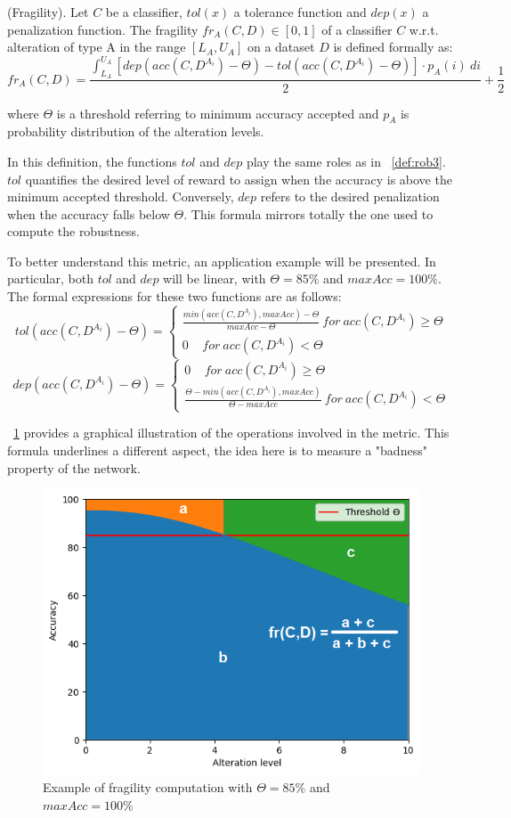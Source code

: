 \begin{definition} (Fragility).
	Let $C$ be a classifier, $tol(x)$ a tolerance function and $dep(x)$ a penalization function.
	The fragility $fr_A(C,D) \in [0,1]$ of a classifier $C$ w.r.t. alteration of type A in the range $[L_A, U_A]$ on a dataset $D$ is defined formally as:
	\[
		fr_A(C,D) = \frac{\int_{L_A}^{U_A} [dep(acc(C,D^{A_i}) - \Theta) - tol(acc(C,D^{A_i}) - \Theta)] \cdot p_A(i)\ di}{2} + \frac{1}{2}
	\]
	
	where $\Theta$ is a threshold referring to minimum accuracy accepted and $p_A$ is probability distribution of the alteration levels.
\end{definition}

In this definition, the functions $tol$ and $dep$ play the same roles as in \Def~\ref{def:rob3}.$tol$ quantifies the desired level of reward to assign when the accuracy is above the minimum accepted threshold. Conversely, $dep$ refers to the desired penalization when the accuracy falls below $\Theta$. This formula mirrors totally the one used to compute the robustness.

To better understand this metric, an application example will be presented. In particular, both $tol$ and $dep$ will be linear, with $\Theta= 85\%$ and $maxAcc = 100 \%$. The formal expressions for these two functions are as follows:
\[
	tol(acc(C,D^{A_i}) - \Theta) = \begin{cases}
		\frac{min(acc(C,D^{A_i}), maxAcc) - \Theta}{maxAcc - \Theta}  \ for  \ acc(C,D^{A_i}) \ge \Theta\\
		0  \ \ \ \ \ for  \ acc(C,D^{A_i}) < \Theta
	\end{cases}
\]
\[
	dep(acc(C,D^{A_i}) - \Theta) = \begin{cases}
		0 \ \ \ \ \ for \ acc(C,D^{A_i}) \ge \Theta\\
		\frac{\Theta - min(acc(C,D^{A_i}), maxAcc)}{\Theta - maxAcc} \ for  \ acc(C,D^{A_i}) < \Theta
	\end{cases}
\]

\Fig~\ref{fig:frag_example} provides a graphical illustration of the operations involved in the metric. This formula underlines a different aspect, the idea here is to measure a "badness" property of the network.

\begin{figure}[h]
	\centering
	\includegraphics[width=0.7\linewidth]{ImageFiles/ANNRob/frag_example}
	\caption{Example of fragility computation with $\Theta=85\%$ and $maxAcc = 100\%$}
	\label{fig:frag_example}
\end{figure}


